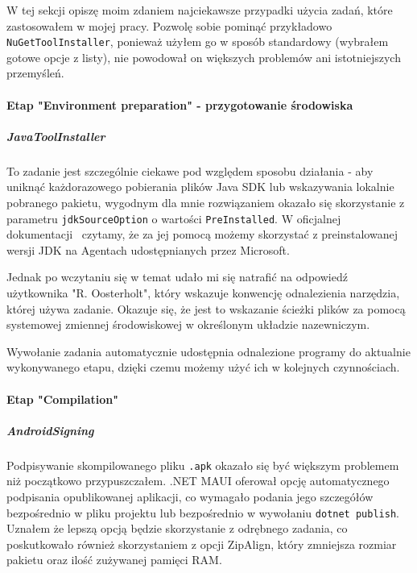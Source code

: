 W tej sekcji opiszę moim zdaniem najciekawsze przypadki użycia zadań, które zastosowałem 
w mojej pracy. Pozwolę sobie pominąć przykładowo \verb|NuGetToolInstaller|, ponieważ użyłem 
go w sposób standardowy (wybrałem gotowe opcje z listy), nie powodował on większych problemów
ani istotniejszych przemyśleń.

\paragraph{Etap "Environment preparation" - przygotowanie środowiska}

\subparagraph{JavaToolInstaller} \label{javaTask}
To zadanie jest szczególnie ciekawe pod względem sposobu działania - aby uniknąć każdorazowego 
pobierania plików Java SDK lub wskazywania lokalnie pobranego pakietu, wygodnym dla mnie 
rozwiązaniem okazało się skorzystanie z parametru \verb|jdkSourceOption| o wartości \verb|PreInstalled|.
W oficjalnej dokumentacji~\cite{jdkSourceOption} czytamy, że za jej pomocą możemy skorzystać 
z preinstalowanej wersji JDK na Agentach udostępnianych przez Microsoft.

Jednak po wczytaniu się w temat udało mi się natrafić na odpowiedź~\cite{javaToolInstaller_StackOverflow} 
użytkownika "R. Oosterholt", który wskazuje konwencję odnalezienia narzędzia, której używa zadanie.
Okazuje się, że jest to wskazanie ścieżki plików za pomocą systemowej zmiennej środowiskowej w określonym 
układzie nazewniczym.

Wywołanie zadania automatycznie udostępnia odnalezione programy do aktualnie wykonywanego etapu, dzięki czemu 
możemy użyć ich w kolejnych czynnościach.

\paragraph{Etap "Compilation"}
\subparagraph{AndroidSigning}
Podpisywanie skompilowanego pliku \verb|.apk| okazało się być większym problemem niż początkowo przypuszczałem.
.NET MAUI oferował opcję automatycznego podpisania opublikowanej aplikacji, co wymagało podania jego szczegółów 
bezpośrednio w pliku projektu lub bezpośrednio w wywołaniu \verb|dotnet publish|.
Uznałem że lepszą opcją będzie skorzystanie z odrębnego zadania, co poskutkowało również skorzystaniem z opcji 
ZipAlign, który zmniejsza rozmiar pakietu oraz ilość zużywanej pamięci RAM.